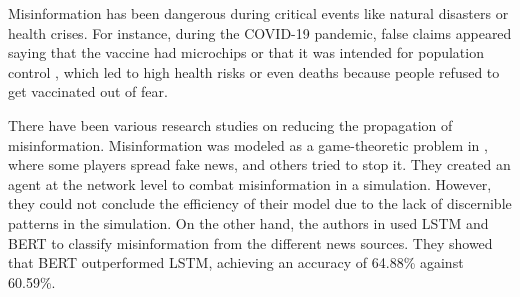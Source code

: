 Misinformation has been dangerous during critical events like natural disasters or health crises. For instance, during the COVID-19 pandemic, false claims appeared saying that the vaccine had
microchips or that it was intended for population control \cite{10.1371/journal.pone.0251605}, which led to high health risks or even deaths \cite{article} because people refused to get vaccinated out of fear. 

There have been various research studies on reducing the propagation of misinformation. Misinformation was modeled as a game-theoretic problem in \cite{9906925}, where some players spread fake news, and others tried
to stop it. They created an agent at the network level to combat misinformation in a simulation. However, they could not conclude the efficiency of their model due to the lack of discernible patterns in the simulation. On
the other hand, the authors in \cite{10100054} used LSTM and BERT to classify misinformation from the different news sources. They showed that BERT outperformed LSTM, achieving an accuracy of 64.88\% against 60.59\%. 


